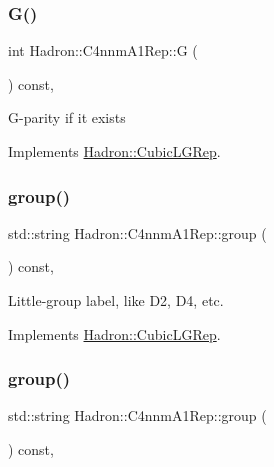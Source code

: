 \subsubsection{\texorpdfstring{G()}{G()}\hspace{0.1cm}{\footnotesize\ttfamily [2/2]}}
{\footnotesize\ttfamily int Hadron\+::\+C4nnm\+A1\+Rep\+::G (\begin{DoxyParamCaption}{ }\end{DoxyParamCaption}) const\hspace{0.3cm}{\ttfamily [inline]}, {\ttfamily [virtual]}}

G-\/parity if it exists 

Implements \mbox{\hyperlink{structHadron_1_1CubicLGRep_ace26f7b2d55e3a668a14cb9026da5231}{Hadron\+::\+Cubic\+L\+G\+Rep}}.

\mbox{\label{structHadron_1_1C4nnmA1Rep_a327b4756034037f9a38a5944d4f98d22}} 
\subsubsection{\texorpdfstring{group()}{group()}\hspace{0.1cm}{\footnotesize\ttfamily [1/3]}}
{\footnotesize\ttfamily std\+::string Hadron\+::\+C4nnm\+A1\+Rep\+::group (\begin{DoxyParamCaption}{ }\end{DoxyParamCaption}) const\hspace{0.3cm}{\ttfamily [inline]}, {\ttfamily [virtual]}}

Little-\/group label, like D2, D4, etc. 

Implements \mbox{\hyperlink{structHadron_1_1CubicLGRep_a9bdb14b519a611d21379ed96a3a9eb41}{Hadron\+::\+Cubic\+L\+G\+Rep}}.

\mbox{\label{structHadron_1_1C4nnmA1Rep_a327b4756034037f9a38a5944d4f98d22}} 
\subsubsection{\texorpdfstring{group()}{group()}\hspace{0.1cm}{\footnotesize\ttfamily [2/3]}}
{\footnotesize\ttfamily std\+::string Hadron\+::\+C4nnm\+A1\+Rep\+::group (\begin{DoxyParamCaption}{ }\end{DoxyParamCaption}) const\hspace{0.3cm}{\ttfamily [inline]}, {\ttfamily [virtual]}}


